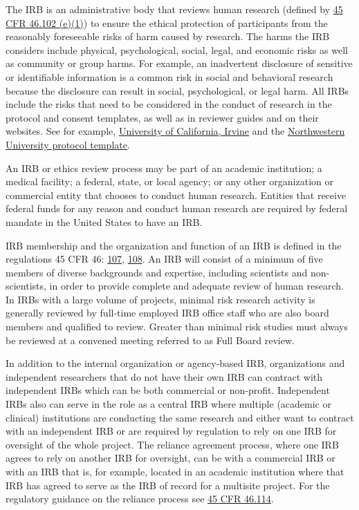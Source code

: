 The IRB is an administrative body that reviews human research (defined by \href{https://www.law.cornell.edu/cfr/text/45/46.102}{45 CFR 46.102 (e)(1)}) to ensure the ethical protection of participants from the reasonably foreseeable risks of harm caused by research. The harms the IRB considers include physical, psychological, social, legal, and economic risks as well as community or group harms. For example, an inadvertent disclosure of sensitive or identifiable information is a common risk in social and behavioral research because the disclosure can result in social, psychological, or legal harm. All IRBs include the risks that need to be considered in the conduct of research in the protocol and consent templates, as well as in reviewer guides and on their websites. See for example, \href{https://research.uci.edu/compliance/human-research-protections/irb-members/assessing-risks-and-benefits.html}{University of California, Irvine} and the \href{https://www.irb.northwestern.edu/templates-forms-sops}{Northwestern University protocol template}.

An IRB or ethics review process may be part of an academic institution; a medical facility; a federal, state, or local agency; or any other organization or commercial entity that chooses to conduct human research. Entities that receive federal funds for any reason and conduct human research are required by federal mandate in the United States to have an IRB.

IRB membership and the organization and function of an IRB is defined in the regulations 45 CFR 46: \href{https://www.law.cornell.edu/cfr/text/45/46.107}{107}, \href{https://www.law.cornell.edu/cfr/text/45/46.108}{108}. An IRB will consist of a minimum of five members of diverse backgrounds and expertise, including scientists and non-scientists, in order to provide complete and adequate review of human research. In IRBs with a large volume of projects, minimal risk research activity is generally reviewed by full-time employed IRB office staff who are also board members and qualified to review. Greater than minimal risk studies must always be reviewed at a convened meeting referred to as Full Board review.



In addition to the internal organization or agency-based IRB, organizations and independent researchers that do not have their own IRB can contract with independent IRBs which can be both commercial or non-profit. Independent IRBs also can serve in the role as a central IRB where multiple (academic or clinical) institutions are conducting the same research and either want to contract with an independent IRB or are required by regulation to rely on one IRB for oversight of the whole project. The reliance agreement process, where one IRB agrees to rely on another IRB for oversight, can be with a commercial IRB or with an IRB that is, for example, located in an academic institution where that IRB has agreed to serve as the IRB of record for a multisite project. For the regulatory guidance on the reliance process see \href{https://www.law.cornell.edu/cfr/text/45/46.114}{45 CFR 46.114}.

